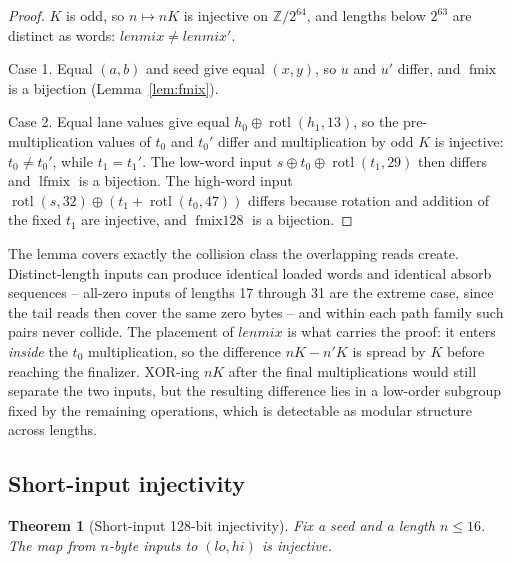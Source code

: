 \documentclass[10pt,a4paper]{article}
\newtheorem{theorem}{Theorem}
\theoremstyle{remark}
\newcommand{\rotl}{\operatorname{rotl}}
\newcommand{\fmix}{\operatorname{fmix}}
\newcommand{\fmixw}{\operatorname{fmix128}}
\newcommand{\lfmix}{\operatorname{lfmix}}
\begin{document}
\begin{proof}
\(K\) is odd, so \(n \mapsto nK\) is injective on \(\mathbb{Z}/2^{64}\), and
lengths below \(2^{63}\) are distinct as words: \(\mathit{lenmix} \neq
\mathit{lenmix}'\).

Case 1.  Equal \((a,b)\) and seed give equal \((x,y)\), so \(u\) and \(u'\)
differ, and \(\fmix\) is a bijection (Lemma~\ref{lem:fmix}).

Case 2.  Equal lane values give equal \(h_0 \oplus \rotl(h_1,13)\), so the
pre-multiplication values of \(t_0\) and \(t_0'\) differ and multiplication
by odd \(K\) is injective: \(t_0 \neq t_0'\), while \(t_1 = t_1'\).  The
low-word input \(s \oplus t_0 \oplus \rotl(t_1,29)\) then differs and
\(\lfmix\) is a bijection.  The high-word input \(\rotl(s,32) \oplus (t_1 +
\rotl(t_0,47))\) differs because rotation and addition of the fixed \(t_1\)
are injective, and \(\fmixw\) is a bijection.
\end{proof}

The lemma covers exactly the collision class the overlapping reads create.
Distinct-length inputs can produce identical loaded words and identical
absorb sequences -- all-zero inputs of lengths 17 through 31 are the extreme
case, since the tail reads then cover the same zero bytes -- and within each
path family such pairs never collide.  The placement of
\(\mathit{lenmix}\) is what carries the proof: it enters \emph{inside} the
\(t_0\) multiplication, so the difference \(nK - n'K\) is spread by \(K\)
before reaching the finalizer.  XOR-ing \(nK\) after the final
multiplications would still separate the two inputs, but the resulting
difference lies in a low-order subgroup fixed by the remaining operations,
which is detectable as modular structure across lengths.

\subsection{Short-input injectivity}
\label{sec:short128}

\begin{theorem}[Short-input 128-bit injectivity]
\label{thm:short128}
Fix a seed and a length \(n \leq 16\).  The map from \(n\)-byte inputs to
\((\mathit{lo},\mathit{hi})\) is injective.
\end{theorem}
\end{document}
